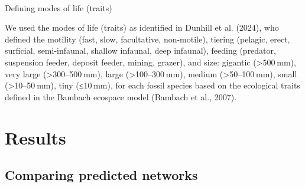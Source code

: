 \documentclass[
]{article}
\makeatletter
\let\oldparagraph\paragraph
\renewcommand{\paragraph}{
    \@ifstar
      \xxxParagraphStar
      \xxxParagraphNoStar
  }
\newcommand{\xxxParagraphStar}[1]{\oldparagraph*{#1}\mbox{}}
\newcommand{\xxxParagraphNoStar}[1]{\oldparagraph{#1}\mbox{}}
\makeatother
\begin{document}
\paragraph{Defining modes of life
(traits)}\label{defining-modes-of-life-traits}

We used the modes of life (traits) as identified in Dunhill et al.
(2024), who defined the motility (fast, slow, facultative, non-motile),
tiering (pelagic, erect, surficial, semi-infaunal, shallow infaunal,
deep infaunal), feeding (predator, suspension feeder, deposit feeder,
mining, grazer), and size: gigantic (\textgreater500 mm), very large
(\textgreater300--500 mm), large (\textgreater100--300 mm), medium
(\textgreater50--100 mm), small (\textgreater10--50 mm), tiny (≤10 mm),
for each fossil species based on the ecological traits defined in the
Bambach ecospace model (Bambach et al., 2007).

\section{Results}\label{results}

\subsection{Comparing predicted
networks}\label{comparing-predicted-networks}
\end{document}
